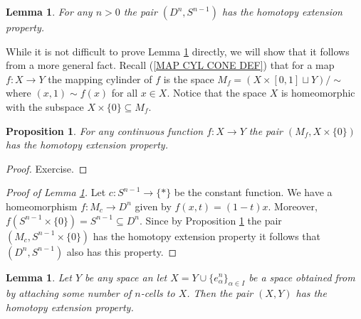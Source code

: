 \documentclass[11pt, letterpaper, oneside]{report}
\theoremstyle{pplain}
\newtheorem{lemma}[theorem]{Lemma}
\newtheorem{proposition}[theorem]{Proposition}
\theoremstyle{ddefinition}
\theoremstyle{nnn}
\theoremstyle{eexercise}
\begin{document}
\begin{lemma}
\label{DN SN-1 HEP LEMMA}
For any $n> 0$  the pair $(D^{n}, S^{n-1})$ has the homotopy extension property. 
\end{lemma}

While it is not difficult to prove Lemma \ref{DN SN-1 HEP LEMMA} directly, we will show that it 
follows from a more general fact.  Recall (\ref{MAP CYL CONE DEF}) that for a map $f\colon X\to Y$ the mapping cylinder of $f$ is the space $M_{f} = (X \times [0, 1] \sqcup Y) /{\sim}$ where  $(x, 1) \sim f(x)$ for all $x\in X$. Notice that the space $X$ is homeomorphic with the subspace $X\times \{0\} \subseteq M_{f}$. 



\begin{proposition}
\label{MAP CYL HEP PROP}
For any continuous function $f\colon X \to Y$ the pair $(M_{f}, X\times \{0\})$ has the homotopy extension property. 
\end{proposition}

\begin{proof}
Exercise. 
\end{proof}


\begin{proof}[Proof of Lemma \ref{DN SN-1 HEP LEMMA}]
Let $c\colon S^{n-1} \to \{\ast\}$ be the constant function. We have a homeomorphism 
$f \colon M_{c} \to D^{n}$ given by $f(x, t) = (1-t)x$. Moreover, $f(S^{n-1}\times \{0\}) = S^{n-1}\subseteq D^{n}$. Since by Proposition \ref{MAP CYL HEP PROP} the pair $(M_{c}, S^{n-1}\times \{0\})$ has the homotopy extension property it follows that $(D^{n}, S^{n-1})$ also has this property. 
\end{proof}

\begin{lemma}
\label{HEP CELL ATTACHMENT LEMMA}
Let $Y$ be any space an let $X = Y\cup\{e^{n}_{\alpha}\}_{\alpha \in I}$ be a space obtained from 
by attaching some number of $n$-cells to $X$. Then the pair $(X, Y)$ has the homotopy 
extension property.   
\end{lemma}
\end{document}
